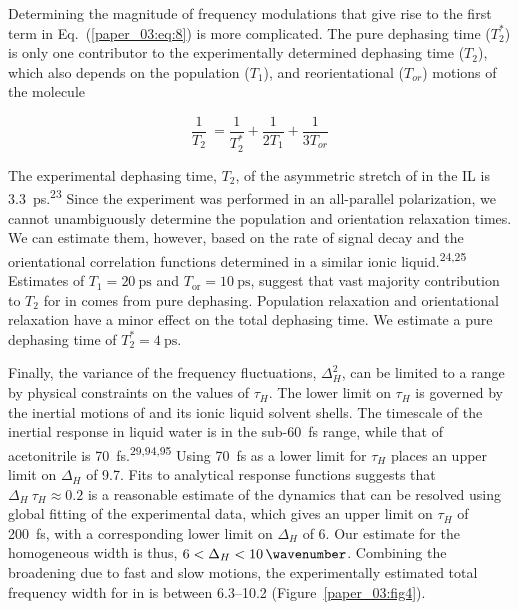 Determining the magnitude of frequency modulations that give rise to the first term in Eq.~(\ref{paper_03:eq:8}) is more complicated. The pure dephasing time (\(T_{2}^{*}\)) is only one contributor to the experimentally determined dephasing time (\(T_{2}\)), which also depends on the population (\(T_{1}\)), and reorientational (\(T_{or}\)) motions of the molecule

\begin{equation}
  \label{paper_03:eq:9}
  \frac{1}{T_{2}}\  = \frac{1}{T_{2}^{*}} + \frac{1}{2T_{1}} + \frac{1}{3T_{or}}
\end{equation}

The experimental dephasing time, \(T_{2}\), of the asymmetric stretch of  in the \ce{[C4C1im][PF6]} IL is \SI{3.3}{\pico\second}.\textsuperscript{23} Since the experiment was performed in an all-parallel polarization, we cannot unambiguously determine the population and orientation relaxation times. We can estimate them, however, based on the rate of signal decay and the orientational correlation functions determined in a similar ionic liquid.\textsuperscript{24,25} Estimates of \(T_{1} = \SI{20}{\pico\second}\) and \(T_{\mathrm{or}} = \SI{10}{\pico\second}\), suggest that vast majority contribution to \(T_{2}\) for  in \ce{[C4C1im][PF6]} comes from pure dephasing. Population relaxation and orientational relaxation have a minor effect on the total dephasing time. We estimate a pure dephasing time of \(T_{2}^{*} = \SI{4}{\pico\second}\).

Finally, the variance of the frequency fluctuations, \(\Delta_{H}^{2}\), can be limited to a range by physical constraints on the values of \(\tau_{H}\). The lower limit on \(\tau_{H}\) is governed by the inertial motions of  and its ionic liquid solvent shells. The timescale of the inertial response in liquid water is in the sub-\SI{60}{\femto\second} range, while that of acetonitrile is \SI{70}{\femto\second}.\textsuperscript{29,94,95} Using \SI{70}{\femto\second} as a lower limit for \(\tau_{H}\) places an upper limit on \(\Delta_{H}\) of \SI{9.7}{\wavenumber}. Fits to analytical response functions suggests that \(\Delta_{H}\ \tau_{H} \approx 0.2\) is a reasonable estimate of the dynamics that can be resolved using global fitting of the experimental data, which gives an upper limit on \(\tau_{H}\) of \SI{200}{\femto\second}, with a corresponding lower limit on \(\Delta_{H}\) of \SI{6}{\wavenumber}. Our estimate for the homogeneous width is thus, \(6 < \Delta_{H} < \SI{10}{\wavenumber}\). Combining the broadening due to fast and slow motions, the experimentally estimated total frequency width for  in \ce{[C4C1im][PF6]} is between \SIrange{6.3}{10.2}{\wavenumber} (Figure~\ref{paper_03:fig4}).


